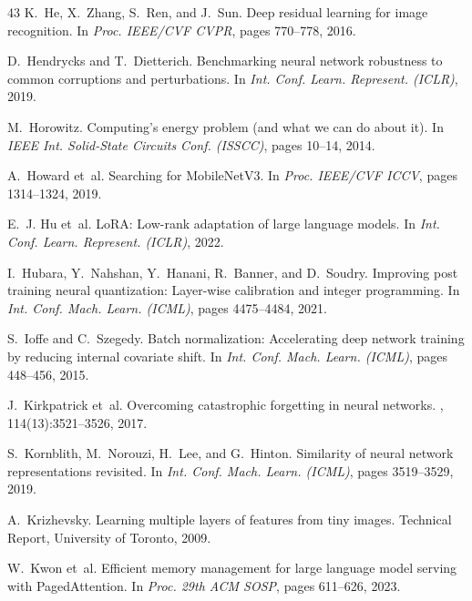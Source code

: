 \documentclass{article}
\begin{document}
\begin{thebibliography}{43}
K.~He, X.~Zhang, S.~Ren, and J.~Sun.
\newblock Deep residual learning for image recognition.
\newblock In {\em Proc. IEEE/CVF CVPR}, pages 770--778, 2016.

D.~Hendrycks and T.~Dietterich.
\newblock Benchmarking neural network robustness to common corruptions and perturbations.
\newblock In {\em Int. Conf. Learn. Represent. (ICLR)}, 2019.

M.~Horowitz.
 Computing's energy problem (and what we can do about it).
\newblock In {\em IEEE Int. Solid-State Circuits Conf. (ISSCC)}, pages 10--14, 2014.

A.~Howard et~al.
\newblock Searching for {MobileNetV3}.
\newblock In {\em Proc. IEEE/CVF ICCV}, pages 1314--1324, 2019.

E.~J. Hu et~al.
\newblock Lo{RA}: Low-rank adaptation of large language models.
\newblock In {\em Int. Conf. Learn. Represent. (ICLR)}, 2022.

I.~Hubara, Y.~Nahshan, Y.~Hanani, R.~Banner, and D.~Soudry.
\newblock Improving post training neural quantization: Layer-wise calibration and integer programming.
\newblock In {\em Int. Conf. Mach. Learn. (ICML)}, pages 4475--4484, 2021.

S.~Ioffe and C.~Szegedy.
\newblock Batch normalization: Accelerating deep network training by reducing internal covariate shift.
\newblock In {\em Int. Conf. Mach. Learn. (ICML)}, pages 448--456, 2015.

J.~Kirkpatrick et~al.
\newblock Overcoming catastrophic forgetting in neural networks.
, 114(13):3521--3526, 2017.

S.~Kornblith, M.~Norouzi, H.~Lee, and G.~Hinton.
\newblock Similarity of neural network representations revisited.
\newblock In {\em Int. Conf. Mach. Learn. (ICML)}, pages 3519--3529, 2019.

A.~Krizhevsky.
\newblock Learning multiple layers of features from tiny images.
\newblock Technical Report, University of Toronto, 2009.

W.~Kwon et~al.
\newblock Efficient memory management for large language model serving with {PagedAttention}.
\newblock In {\em Proc. 29th ACM SOSP}, pages 611--626, 2023.


\end{thebibliography}
\end{document}
